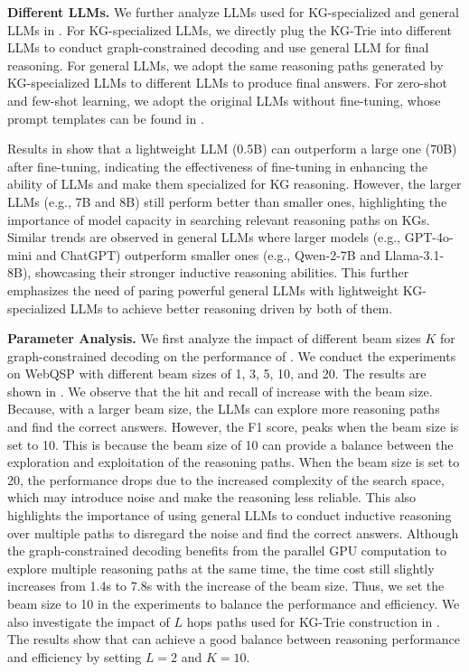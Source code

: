 \noindent\textbf{Different LLMs.} We further analyze LLMs used for KG-specialized and general LLMs in . For KG-specialized LLMs, we directly plug the KG-Trie into different LLMs to conduct graph-constrained decoding and use  general LLM for final reasoning. For general LLMs, we adopt the same reasoning paths generated by KG-specialized LLMs to different LLMs to produce final answers. For zero-shot and few-shot learning, we adopt the original LLMs without fine-tuning, whose prompt templates can be found in .


Results in  show that a lightweight LLM (0.5B) can outperform a large one (70B) after fine-tuning, indicating the effectiveness of fine-tuning in enhancing the ability of LLMs and make them specialized for KG reasoning.
However, the larger LLMs (e.g., 7B and 8B) still perform better than smaller ones, highlighting the importance of model capacity in searching relevant reasoning paths on KGs. Similar trends are observed in general LLMs where larger models (e.g., GPT-4o-mini and ChatGPT) outperform smaller ones (e.g., Qwen-2-7B and Llama-3.1-8B), showcasing their stronger inductive reasoning abilities. This further emphasizes the need of paring powerful general LLMs with lightweight KG-specialized LLMs to achieve better reasoning driven by both of them.



\noindent\textbf{Parameter Analysis.} We first analyze the impact of different beam sizes $K$ for graph-constrained decoding on the performance of \ourmethod. We conduct the experiments on WebQSP with different beam sizes of 1, 3, 5, 10, and 20. The results are shown in . We observe that the hit and recall of \ourmethod increase with the beam size. Because, with a larger beam size, the LLMs can explore more reasoning paths and find the correct answers. However, the F1 score, peaks when the beam size is set to 10. This is because the beam size of 10 can provide a balance between the exploration and exploitation of the reasoning paths. When the beam size is set to 20, the performance drops due to the increased complexity of the search space, which may introduce noise and make the reasoning less reliable. This also highlights the importance of using general LLMs to conduct inductive reasoning over multiple paths to disregard the noise and find the correct answers. Although the graph-constrained decoding benefits from the parallel GPU computation to explore multiple reasoning paths at the same time, the time cost still slightly increases from 1.4s to 7.8s with the increase of the beam size. Thus, we set the beam size to 10 in the experiments to balance the performance and efficiency. We also investigate the impact of $L$ hops paths used for KG-Trie construction in . The results show that \ourmethod can achieve a good balance between reasoning performance and efficiency by setting $L=2$ and $K=10$.

